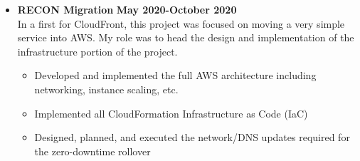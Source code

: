 \documentclass[overlapped]{res}
\begin{document}
\begin{resume}
\begin{itemize}[leftmargin=0in]
\begin{itemize}
        \item[]
        \textbf{RECON Migration} \hfill \textbf{May 2020-October 2020} \\
        In a first for CloudFront, this project was focused on moving a very simple service into AWS. 
        My role was to head the design and implementation of the infrastructure portion
        of the project.

        \begin{itemize}
          \item[\textbullet] Developed and implemented the full AWS architecture including networking, instance scaling, etc.
          \item[\textbullet] Implemented all CloudFormation Infrastructure as Code (IaC) 
          \item[\textbullet] Designed, planned, and executed the network/DNS updates required for the zero-downtime rollover
        \end{itemize}
        \vspace{0.125in}

    \end{itemize}
    \vspace{0.125in}


\end{itemize}
\end{resume}
\end{document}
